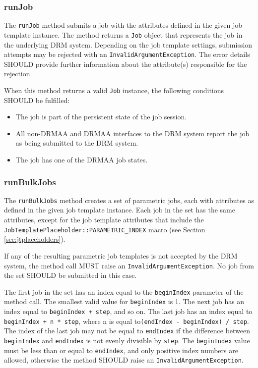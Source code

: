 \documentclass{article}
\newcommand{\h}[1]{\lstinline|#1|}
\begin{document}
\subsubsection{runJob}

The \h{runJob} method submits a job with the attributes defined in the given job template instance. The method returns a \h{Job} object that represents the job in the underlying DRM system. Depending on the job template settings, submission attempts may be rejected with an \h{InvalidArgumentException}. The error details SHOULD provide further information about the attribute(s) responsible for the rejection.

When this method returns a valid \h{Job} instance, the following conditions SHOULD be fulfilled:

\begin{itemize}
	\item The job is part of the persistent state of the job session.
	\item All non-DRMAA and DRMAA interfaces to the DRM system report the job as being submitted to the DRM system.
	\item The job has one of the DRMAA job states.
\end{itemize}	

\subsubsection{runBulkJobs}
\label{sec:runbulkjobs}

The \h{runBulkJobs} method creates a set of parametric jobs, each with attributes as defined in the given job template instance. Each job in the set has the same attributes, except for the job template attributes that include the \h{JobTemplatePlaceholder::PARAMETRIC_INDEX} macro (see Section \ref{sec:jtplaceholders}). 

If any of the resulting parametric job templates is not accepted by the DRM system, the method call MUST raise an \h{InvalidArgumentException}. No job from the set SHOULD be submitted in this case.

The first job in the set has an index equal to the \h{beginIndex} parameter of the method call. The smallest valid value for \h{beginIndex} is 1. The next job has an index equal to \h{beginIndex + step}, and so on. The last job has an index equal to \h{beginIndex + n * step}, where n is equal to\h{(endIndex - beginIndex) / step}. The index of the last job may not be equal to \h{endIndex} if the difference between \h{beginIndex} and \h{endIndex} is not evenly divisible by \h{step}. The \h{beginIndex} value must be less than or equal to \h{endIndex}, and only positive index numbers are allowed, otherwise the method SHOULD raise an \h{InvalidArgumentException}. 
\end{document}
